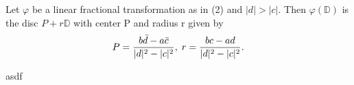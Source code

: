 \begin{lemma}
Let $\varphi$ be a linear fractional transformation as in (2) and $|d| > |c|$.  Then $\varphi(\mathbb{D})$ is the disc $P+r\mathbb{D}$ with center P and radius r given by
\[P = \frac{b\bar{d} - a\bar{c}}{|d|^2 - |c|^2}, \;r = \frac{bc - ad}{|d|^2 - |c|^2}.\]
\end{lemma}

asdf